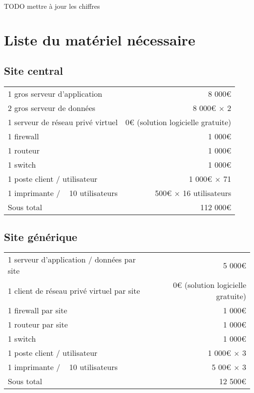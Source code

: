 TODO mettre à jour les chiffres

\section{Liste du matériel nécessaire}
    \subsection{Site central}
        \begin{tabular*}{\textwidth}{ l @{\extracolsep{\fill}} r }
	        1 gros serveur d'application        & 8 000€ \\ 
	        2 gros serveur de données           & 8 000€ $\times$ 2 \\ 
	        1 serveur de réseau privé virtuel   & 0€ (solution logicielle gratuite)\\ 
            1 firewall                          & 1 000€ \\ 
	        1 routeur                           & 1 000€ \\ 
	        1 switch                            & 1 000€ \\ 
	        1 poste client / utilisateur        & 1 000€ $\times$ 71\\
	        1 imprimante / ~ 10 utilisateurs    & 500€ $\times$ 16 utilisateurs\\ \hline
	        Sous total                          & 112 000€
        \end{tabular*}
        
    \subsection{Site générique}
        \begin{tabular*}{\textwidth}{ l @{\extracolsep{\fill}} r }
	        1 serveur d'application / données par site  & 5 000€ \\ 
	        1 client de réseau privé virtuel par site   & 0€ (solution logicielle gratuite)\\ 
            1 firewall par site                         & 1 000€ \\ 
	        1 routeur par site                          & 1 000€ \\ 
	        1 switch                                    & 1 000€ \\ 
	        1 poste client / utilisateur                & 1 000€ $\times$ 3 \\
	        1 imprimante / ~ 10 utilisateurs            & 5 00€ $\times$ 3 \\ \hline
	        Sous total                                  & 12 500€
        \end{tabular*}

